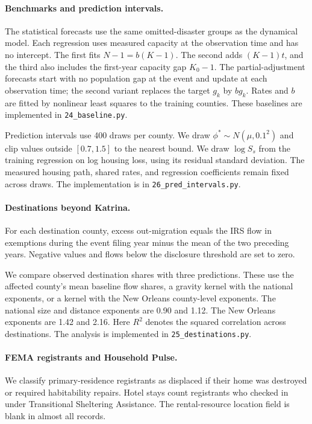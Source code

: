 \documentclass[11pt]{article}
\begin{document}
\paragraph{Benchmarks and prediction intervals.} The statistical forecasts use the same omitted-disaster groups as the dynamical model. Each regression uses measured capacity at the observation time and has no intercept. The first fits $N-1=b(K-1)$. The second adds $(K-1)t$, and the third also includes the first-year capacity gap $K_0-1$. The partial-adjustment forecasts start with no population gap at the event and update at each observation time; the second variant replaces the target $g_k$ by $bg_k$. Rates and $b$ are fitted by nonlinear least squares to the training counties. These baselines are implemented in \texttt{24\_baseline.py}.

Prediction intervals use 400 draws per county. We draw $\phi^*\sim N(\mu,0.1^2)$ and clip values outside $[0.7,1.5]$ to the nearest bound. We draw $\log S_s$ from the training regression on log housing loss, using its residual standard deviation. The measured housing path, shared rates, and regression coefficients remain fixed across draws. The implementation is in \texttt{26\_pred\_intervals.py}.

\paragraph{Destinations beyond Katrina.} For each destination county, excess out-migration equals the IRS flow in exemptions during the event filing year minus the mean of the two preceding years. Negative values and flows below the disclosure threshold are set to zero.

We compare observed destination shares with three predictions. These use the affected county's mean baseline flow shares, a gravity kernel with the national exponents, or a kernel with the New Orleans county-level exponents. The national size and distance exponents are 0.90 and 1.12. The New Orleans exponents are 1.42 and 2.16. Here $R^2$ denotes the squared correlation across destinations. The analysis is implemented in \texttt{25\_destinations.py}.

\paragraph{FEMA registrants and Household Pulse.} We classify primary-residence registrants as displaced if their home was destroyed or required habitability repairs. Hotel stays count registrants who checked in under Transitional Sheltering Assistance. The rental-resource location field is blank in almost all records.
\end{document}
